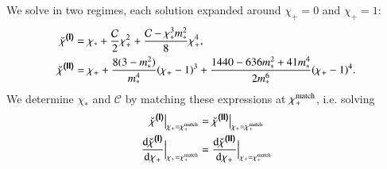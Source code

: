 We solve in two regimes, each solution expanded around  $\chi_+=0$ and  $\chi_+=1$:
\begin{subequations}
    \begin{align}
        \brchi^{\text{\eqregimenum{I}}}  &= \chi_\ast + \frac{\mathcal{C}}{2}\chi_+^2 + \frac{\mathcal{C}-\chi_\ast^3 m_\ast^2}{8} \chi_+^4 ,\\ %
        \brchi^{\text{\eqregimenum{II}}} &= \chi_+ + \frac{8(3-m_\ast^2)}{m_\ast^4} \pclosed{\chi_+ -1}^3 + \frac{1440 - 636 m_\ast^2 + 41 m_\ast^4}{2 m_\ast^6} \pclosed{\chi_+ -1}^4. %
    \end{align}
\end{subequations}
We determine $\chi_\ast$ and $\mathcal{C}$ by matching these expressions at $\chi_+^\mathrm{match}$, 
i.e. solving
\begin{equation}
    \begin{split}
        \breve{\chi}^{\text{{\footnotesize{\textsf{\textbf{({I})}}}}}}\big|_{\chi_+=\chi_+^\mathrm{match}} &= \breve{\chi}^{\text{{\footnotesize{\textsf{\textbf{({II})}}}}}}\big|_{\chi_+=\chi_+^\mathrm{match}} \\
        \dv{\breve{\chi}^{\text{{\footnotesize{\textsf{\textbf{({I})}}}}}}}{\chi_+}\Big|_{\chi_+=\chi_+^\mathrm{match}} &= \dv{\breve{\chi}^{\text{{\footnotesize{\textsf{\textbf{({II})}}}}}}}{\chi_+}\Big|_{\chi_+=\chi_+^\mathrm{match}}
    \end{split}
\end{equation}

